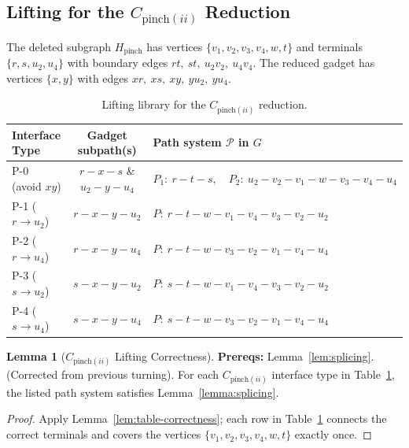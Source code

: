 \documentclass[12pt]{article}
\theoremstyle{definition}
\newtheorem{lemma}[theorem]{Lemma}
\begin{document}
\subsection{Lifting for the $C_{\text{pinch}(ii)}$ Reduction}
\label{subsec:lifting-pinch}

The deleted subgraph $H_{\text{pinch}}$ has vertices $\{v_1,v_2,v_3,v_4,w,t\}$ and terminals
$\{r,s,u_2,u_4\}$ with boundary edges $rt,\ st,\ u_2v_2,\ u_4v_4$.
The reduced gadget has vertices $\{x,y\}$ with edges
$xr,\ xs,\ xy,\ yu_2,\ yu_4$.

\begin{table}[ht]
\centering
\begin{center}
\small
\begin{tabularx}{\textwidth}{|l|c|X|}
\hline
\textbf{Interface Type} &
\textbf{Gadget subpath(s)} &
\textbf{Path system $\mathcal{P}$ in $G$} \\
\hline
P-0 (avoid $xy$) &
$r\!-\!x\!-\!s$ \& $u_2\!-\!y\!-\!u_4$ &
$P_1:\ r\!-\!t\!-\!s,\quad P_2:\ u_2\!-\!v_2\!-\!v_1\!-\!w\!-\!v_3\!-\!v_4\!-\!u_4$\\
\hline
P-1 ($r \to u_2$) &
$r\!-\!x\!-\!y\!-\!u_2$ &
$P:\ r\!-\!t\!-\!w\!-\!v_1\!-\!v_4\!-\!v_3\!-\!v_2\!-\!u_2$\\
\hline
P-2 ($r \to u_4$) &
$r\!-\!x\!-\!y\!-\!u_4$ &
$P:\ r\!-\!t\!-\!w\!-\!v_3\!-\!v_2\!-\!v_1\!-\!v_4\!-\!u_4$\\
\hline
P-3 ($s \to u_2$) &
$s\!-\!x\!-\!y\!-\!u_2$ &
$P:\ s\!-\!t\!-\!w\!-\!v_1\!-\!v_4\!-\!v_3\!-\!v_2\!-\!u_2$\\
\hline
P-4 ($s \to u_4$) &
$s\!-\!x\!-\!y\!-\!u_4$ &
$P:\ s\!-\!t\!-\!w\!-\!v_3\!-\!v_2\!-\!v_1\!-\!v_4\!-\!u_4$\\
\hline
\end{tabularx}
\end{center}
\caption{Lifting library for the $C_{\text{pinch}(ii)}$ reduction.}
\label{tab:lifting-pinch}
\end{table}

\begin{lemma}[$C_{\text{pinch}(ii)}$ Lifting Correctness]
\label{lem:lifting-pinch}
\label{lemma:pinch-lifting}
\textbf{Prereqs:} Lemma~\ref{lem:splicing}. (Corrected from previous turning).
For each $C_{\text{pinch}(ii)}$ interface type in Table~\ref{tab:lifting-pinch}, the listed
path system satisfies Lemma~\ref{lemma:splicing}.
\end{lemma}

\begin{proof}
Apply Lemma~\ref{lem:table-correctness}; each row in Table~\ref{tab:lifting-pinch} connects the correct terminals and covers the vertices $\{v_1,v_2,v_3,v_4,w,t\}$ exactly once.
\end{proof}
\end{document}
